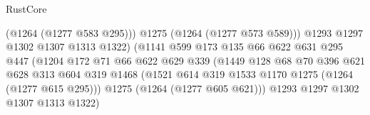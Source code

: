\begin{lexlean}{RustCore}
\begin{coremodule}
                                              (@1264 (@1277 @583 @295)))
                                            @1275
                                            (@1264 (@1277 @573 @589)))
                                          @1293
                                          @1297
                                          @1302
                                          @1307
                                          @1313
                                          @1322)
                                        (@1141
                                          @599
                                          @173
                                          @135
                                          @66
                                          @622
                                          @631
                                          @295
                                          @447
                                          (@1204
                                            @172
                                            @71
                                            @66
                                            @622
                                            @629
                                            @339
                                            (@1449
                                              @128
                                              @68
                                              @70
                                              @396
                                              @621
                                              @628
                                              @313
                                              @604
                                              @319
                                              @1468
                                              (@1521
                                                @614
                                                @319
                                                @1533
                                                @1170
                                                @1275
                                                (@1264 (@1277 @615 @295)))
                                              @1275
                                              (@1264 (@1277 @605 @621)))
                                            @1293
                                            @1297
                                            @1302
                                            @1307
                                            @1313
                                            @1322)

\end{coremodule}
\end{lexlean}

